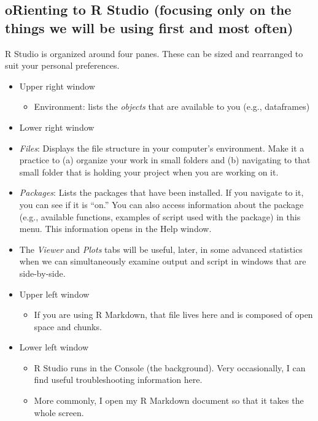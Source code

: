 \documentclass[
  11pt,
]{book}
\providecommand{\tightlist}{%
  \setlength{\itemsep}{0pt}\setlength{\parskip}{0pt}}
\begin{document}
\hypertarget{orienting-to-r-studio-focusing-only-on-the-things-we-will-be-using-first-and-most-often}{%
\subsection{oRienting to R Studio (focusing only on the things we will be using first and most often)}\label{orienting-to-r-studio-focusing-only-on-the-things-we-will-be-using-first-and-most-often}}

R Studio is organized around four panes. These can be sized and rearranged to suit your personal preferences.

\begin{itemize}
\tightlist
\item
  Upper right window

  \begin{itemize}
  \tightlist
  \item
    Environment: lists the \emph{objects} that are available to you (e.g., dataframes)
  \end{itemize}
\item
  Lower right window
\item
  \emph{Files}: Displays the file structure in your computer's environment. Make it a practice to (a) organize your work in small folders and (b) navigating to that small folder that is holding your project when you are working on it.
\item
  \emph{Packages}: Lists the packages that have been installed. If you navigate to it, you can see if it is ``on.'' You can also access information about the package (e.g., available functions, examples of script used with the package) in this menu. This information opens in the Help window.
\item
  The \emph{Viewer} and \emph{Plots} tabs will be useful, later, in some advanced statistics when we can simultaneously examine output and script in windows that are side-by-side.
\item
  Upper left window

  \begin{itemize}
  \tightlist
  \item
    If you are using R Markdown, that file lives here and is composed of open space and chunks.
  \end{itemize}
\item
  Lower left window

  \begin{itemize}
  \tightlist
  \item
    R Studio runs in the Console (the background). Very occasionally, I can find useful troubleshooting information here.
  \item
    More commonly, I open my R Markdown document so that it takes the whole screen.
  \end{itemize}
\end{itemize}
\end{document}
